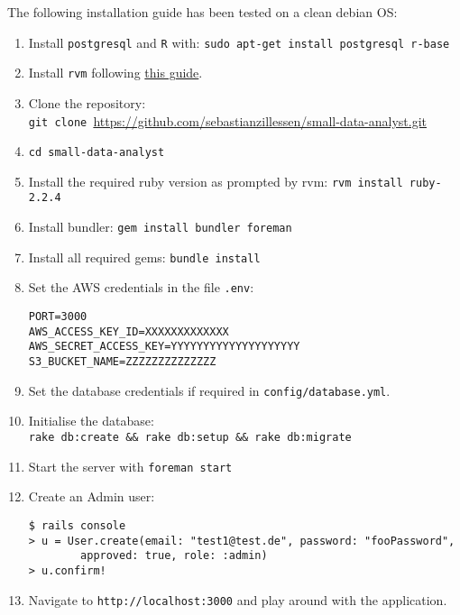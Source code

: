 The following installation guide has been tested on a clean debian OS:

\begin{enumerate}
\def\labelenumi{\arabic{enumi}.}
\item
  Install \texttt{postgresql} and \texttt{R} with:
  \texttt{sudo\ apt-get\ install\ postgresql\ r-base}
\item
  Install \texttt{rvm} following \href{https://rvm.io/rvm/install}{this
  guide}.
\item
  Clone the repository:\\
  \texttt{git\ clone\ }\url{https://github.com/sebastianzillessen/small-data-analyst.git}
\item
  \texttt{cd\ small-data-analyst}
\item
  Install the required ruby version as prompted by rvm:
  \texttt{rvm\ install\ ruby-2.2.4}
\item
  Install bundler: \texttt{gem\ install\ bundler\ foreman}
\item
  Install all required gems: \texttt{bundle\ install}
\item
  Set the AWS credentials in the file \texttt{.env}:

\begin{verbatim}
PORT=3000
AWS_ACCESS_KEY_ID=XXXXXXXXXXXXX
AWS_SECRET_ACCESS_KEY=YYYYYYYYYYYYYYYYYYYY
S3_BUCKET_NAME=ZZZZZZZZZZZZZZ
\end{verbatim}
\item Set the database credentials if required in \texttt{config/database.yml}.
\item
  Initialise the database:\\
  \texttt{rake\ db:create\ \&\&\ rake\ db:setup\ \&\&\ rake\ db:migrate}
\item
  Start the server with \texttt{foreman\ start}
\item
  Create an Admin user:

\begin{verbatim}
$ rails console
> u = User.create(email: "test1@test.de", password: "fooPassword", 
		approved: true, role: :admin)
> u.confirm!
\end{verbatim}
\item
  Navigate to \texttt{http://localhost:3000} and play around with the
  application.
\end{enumerate}
